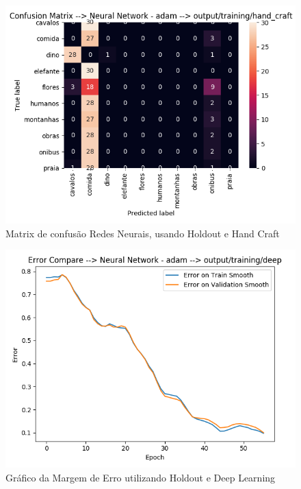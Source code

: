 \documentclass[
article,			%
11pt,				%
oneside,			%
a4paper,			%
english,			%
brazil,				%
sumario=tradicional,
]{abntex2}
\begin{document}
\begin{anexosenv}
\begin{figure}[htb]
	\caption{\label{confusion-matrix-neural-network-hodoult-hand-craft}Matrix de confusão Redes Neurais, usando Holdout e Hand Craft}
	\begin{center}
		\includegraphics[scale=0.5]{confusion-matrix-neural-network-hodoult-hand-craft.png}
	\end{center}
\end{figure}

\begin{figure}[htb]
	\caption{\label{error-neural-network-holdout-deep}Gráfico da Margem de Erro utilizando Holdout e Deep Learning}
	\begin{center}
		\includegraphics[scale=0.5]{error-neural-network-holdout-deep.png}
	\end{center}
\end{figure}



\end{anexosenv}
\end{document}
